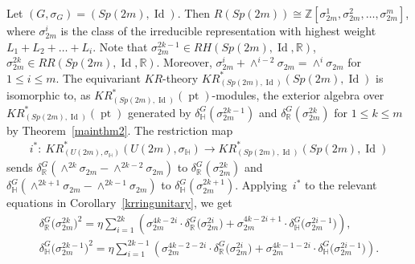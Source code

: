 \documentclass[pdftex]{sigma}
\numberwithin{equation}{section}
\DeclareMathOperator{\pt}{pt}
\DeclareMathOperator{\Id}{Id}
\begin{document}
\begin{Example}
Let $(G,\sigma_G)=(Sp(2m),\Id)$.
Then $R(Sp(2m))\cong\mathbb{Z}[\sigma_{2m}^1,\sigma_{2m}^2, \dots,\sigma_{2m}^m]$,
where $\sigma_{2m}^i$ is the class of the irreducible representation with highest weight $L_1+L_2+\dots+L_i$.
Note that $\sigma_{2m}^{2k-1}\in RH(Sp(2m),\Id , \mathbb{R})$, $\sigma_{2m}^{2k}\in RR(Sp(2m),\Id , \mathbb{R})$.
Moreover, $\sigma_{2m}^i+\wedge^{i-2}
\sigma_{2m}
=\wedge^i
\sigma_{2m}$ for $1\leq i\leq m$.
The equivariant $KR$-theory $KR^*_{(Sp(2m),\Id)}(Sp(2m),\Id)$ is isomorphic to, as $KR^*_{(Sp(2m),
\Id)}(\pt)$-modules, the exterior algebra over $KR^*_{(Sp(2m),\Id)}(\pt)$ generated by
$\delta_\mathbb{H}^G(\sigma_{2m}^{2k-1})$ and $\delta_\mathbb{R}^G(\sigma_{2m}^{2k})$ for $1\leq k\leq m$
by Theorem~\ref{mainthm2}.
The restriction map
\begin{gather*}
i^*: \ KR_{(U(2m),
\sigma_\mathbb{H})}^*(U(2m),
\sigma_\mathbb{H})\to KR_{(Sp(2m),\Id)}^*(Sp(2m),\Id)
\end{gather*}
sends $\delta_{\mathbb{R}}^G(\wedge^{2k}
\sigma_{2m}
-\wedge^{2k-2}
\sigma_{2m})$ to $\delta_{\mathbb{R}}^G(\sigma_{2m}^{2k})$ and $\delta_{\mathbb{H}}^G(\wedge^{2k+1}
\sigma_{2m}
-\wedge^{2k-1}
\sigma_{2m})$ to $\delta_{\mathbb{H}}^G(\sigma_{2m}^{2k+1})$.
Applying~$i^*$ to the relevant equations in Corollary~\ref{krringunitary}, we get
\begin{gather*}
\delta_\mathbb{R}^G\big(\sigma_{2m}^{2k}\big)^2=\eta
\sum\limits_{i=1}^{2k}\left(\sigma_{2m}^{4k-2i}\cdot\delta^G_\mathbb{R}\big(\sigma_{2m}^{2i}\big)+
\sigma_{2m}^{4k-2i+1}\cdot\delta^G_\mathbb{H}\big(\sigma_{2m}^{2i-1}\big)\right),
\\[-1pt]
\delta_\mathbb{H}^G\big(\sigma_{2m}^{2k-1}\big)^2=\eta
\sum\limits_{i=1}^{2k-1}\left(\sigma_{2m}^{4k-2-2i}\cdot\delta^G_\mathbb{R}\big(\sigma_{2m}^{2i}\big)+
\sigma_{2m}^{4k-1-2i}\cdot\delta^G_\mathbb{H}\big(\sigma_{2m}^{2i-1}\big)\right).
\end{gather*}
\end{Example}
\end{document}
